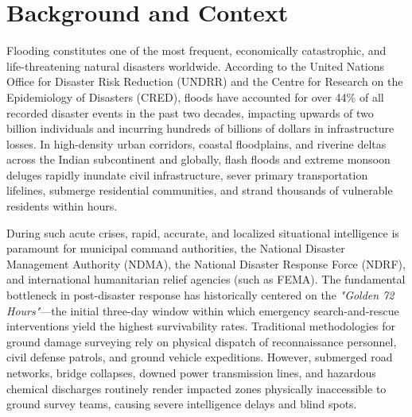 \label{chap:introduction}

\section{Background and Context}
Flooding constitutes one of the most frequent, economically catastrophic, and life-threatening natural disasters worldwide. According to the United Nations Office for Disaster Risk Reduction (UNDRR) and the Centre for Research on the Epidemiology of Disasters (CRED), floods have accounted for over 44\% of all recorded disaster events in the past two decades, impacting upwards of two billion individuals and incurring hundreds of billions of dollars in infrastructure losses. In high-density urban corridors, coastal floodplains, and riverine deltas across the Indian subcontinent and globally, flash floods and extreme monsoon deluges rapidly inundate civil infrastructure, sever primary transportation lifelines, submerge residential communities, and strand thousands of vulnerable residents within hours.

During such acute crises, rapid, accurate, and localized situational intelligence is paramount for municipal command authorities, the National Disaster Management Authority (NDMA), the National Disaster Response Force (NDRF), and international humanitarian relief agencies (such as FEMA). The fundamental bottleneck in post-disaster response has historically centered on the \textit{"Golden 72 Hours"}—the initial three-day window within which emergency search-and-rescue interventions yield the highest survivability rates. Traditional methodologies for ground damage surveying rely on physical dispatch of reconnaissance personnel, civil defense patrols, and ground vehicle expeditions. However, submerged road networks, bridge collapses, downed power transmission lines, and hazardous chemical discharges routinely render impacted zones physically inaccessible to ground survey teams, causing severe intelligence delays and blind spots.

